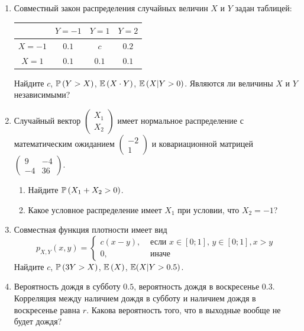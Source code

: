 \begin{enumerate}

\item Совместный закон распределения случайных величин  $X$  и  $Y$ задан таблицей:

\begin{center}
\begin{tabular}{@{}cccc@{}}
\toprule
       & $Y=-1$ & $Y=1$ & $Y=2$ \\ \midrule
$X=-1$ & $0.1$  & $c$   & $0.2$ \\
$X=1$  & $0.1$  & $0.1$ & $0.1$ \\ \bottomrule
\end{tabular}
\end{center}

Найдите  $c$,  $\P\left(Y>X\right)$,  $\E\left(X\cdot Y \right)$,  $\E\left(X|Y>0\right)$.
Являются ли величины $X$ и $Y$ независимыми?

\item Случайный вектор  $\left(\begin{array}{c}
{X_{1} } \\ {X_{2} }
\end{array}\right)$  имеет нормальное распределение с
математическим ожиданием  $\left(\begin{array}{c} {-2} \\ {1}
\end{array}\right)$  и ковариационной матрицей
$\left(\begin{array}{cc} {9} & {-4} \\ {-4} & {36}
\end{array}\right)$.
\begin{enumerate}
\item Найдите  $\P\left(X_{1} +X_{2} >0\right)$.
\item Какое условное распределение имеет $X_{1}$ при условии, что $X_{2}=-1$?
\end{enumerate}

\item Совместная функция плотности имеет вид
\[
p_{X,Y} \left(x,y\right)=
\begin{cases}
  c(x-y), & \text{ если } x\in \left[0;1\right],\, y\in \left[0;1\right], x>y \\
  0, & \text{ иначе}
\end{cases}
\]
Найдите  $c$, $\P\left(3Y>X\right)$,  $\E\left(X\right)$, $\E(X|Y>0.5)$.

\item Вероятность дождя в субботу $0.5$, вероятность дождя в воскресенье $0.3$.
Корреляция между наличием дождя в субботу и наличием дождя в воскресенье равна $r$.
Какова вероятность того, что в выходные вообще не будет дождя?


\end{enumerate}
